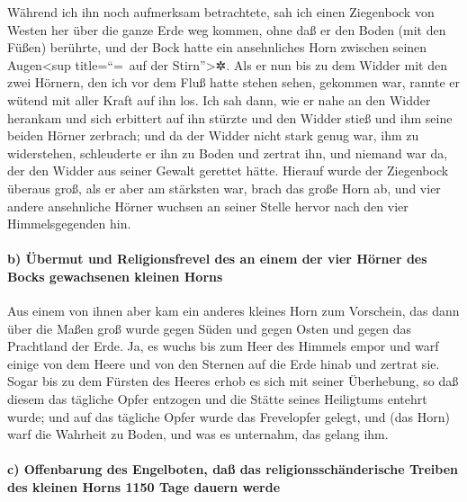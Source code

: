 Während ich ihn noch aufmerksam betrachtete, sah ich einen
Ziegenbock von Westen her über die ganze Erde weg kommen, ohne daß er
den Boden (mit den Füßen) berührte, und der Bock hatte ein ansehnliches
Horn zwischen seinen Augen\textless sup title=``=~auf der
Stirn''\textgreater✲. Als er nun bis zu dem Widder mit den
zwei Hörnern, den ich vor dem Fluß hatte stehen sehen, gekommen war,
rannte er wütend mit aller Kraft auf ihn los. Ich sah
dann, wie er nahe an den Widder herankam und sich erbittert auf ihn
stürzte und den Widder stieß und ihm seine beiden Hörner zerbrach; und
da der Widder nicht stark genug war, ihm zu widerstehen, schleuderte er
ihn zu Boden und zertrat ihn, und niemand war da, der den Widder aus
seiner Gewalt gerettet hätte. Hierauf wurde der Ziegenbock
überaus groß, als er aber am stärksten war, brach das große Horn ab, und
vier andere ansehnliche Hörner wuchsen an seiner Stelle hervor nach den
vier Himmelsgegenden hin.

\hypertarget{b-uxfcbermut-und-religionsfrevel-des-an-einem-der-vier-huxf6rner-des-bocks-gewachsenen-kleinen-horns}{%
\paragraph{b) Übermut und Religionsfrevel des an einem der vier Hörner
des Bocks gewachsenen kleinen
Horns}\label{b-uxfcbermut-und-religionsfrevel-des-an-einem-der-vier-huxf6rner-des-bocks-gewachsenen-kleinen-horns}}

Aus einem von ihnen aber kam ein anderes kleines Horn zum
Vorschein, das dann über die Maßen groß wurde gegen Süden und gegen
Osten und gegen das Prachtland der Erde. Ja, es wuchs bis
zum Heer des Himmels empor und warf einige von dem Heere und von den
Sternen auf die Erde hinab und zertrat sie. Sogar bis zu
dem Fürsten des Heeres erhob es sich mit seiner Überhebung, so daß
diesem das tägliche Opfer entzogen und die Stätte seines Heiligtums
entehrt wurde; und auf das tägliche Opfer wurde das
Frevelopfer gelegt, und (das Horn) warf die Wahrheit zu Boden, und was
es unternahm, das gelang ihm.

\hypertarget{c-offenbarung-des-engelboten-dauxdf-das-religionsschuxe4nderische-treiben-des-kleinen-horns-1150-tage-dauern-werde}{%
\paragraph{c) Offenbarung des Engelboten, daß das religionsschänderische
Treiben des kleinen Horns 1150 Tage dauern
werde}\label{c-offenbarung-des-engelboten-dauxdf-das-religionsschuxe4nderische-treiben-des-kleinen-horns-1150-tage-dauern-werde}}

